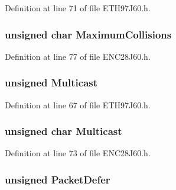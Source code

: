 Definition at line 71 of file E\+T\+H97\+J60.\+h.

\hypertarget{union_t_x_s_t_a_t_u_s_ab7d8a02ccf8756430facd06138a89206}{}
\subsubsection[{Maximum\+Collisions}]{\setlength{\rightskip}{0pt plus 5cm}unsigned char Maximum\+Collisions}\label{union_t_x_s_t_a_t_u_s_ab7d8a02ccf8756430facd06138a89206}


Definition at line 77 of file E\+N\+C28\+J60.\+h.

\hypertarget{union_t_x_s_t_a_t_u_s_a5a52ba8e63ab70f9a14871502a54fb01}{}
\subsubsection[{Multicast}]{\setlength{\rightskip}{0pt plus 5cm}unsigned Multicast}\label{union_t_x_s_t_a_t_u_s_a5a52ba8e63ab70f9a14871502a54fb01}


Definition at line 67 of file E\+T\+H97\+J60.\+h.

\hypertarget{union_t_x_s_t_a_t_u_s_af1db8263c2237487c1065633cf2cc925}{}
\subsubsection[{Multicast}]{\setlength{\rightskip}{0pt plus 5cm}unsigned char Multicast}\label{union_t_x_s_t_a_t_u_s_af1db8263c2237487c1065633cf2cc925}


Definition at line 73 of file E\+N\+C28\+J60.\+h.

\hypertarget{union_t_x_s_t_a_t_u_s_a487a99b94f1220edf3ade3b062353107}{}
\subsubsection[{Packet\+Defer}]{\setlength{\rightskip}{0pt plus 5cm}unsigned Packet\+Defer}\label{union_t_x_s_t_a_t_u_s_a487a99b94f1220edf3ade3b062353107}



